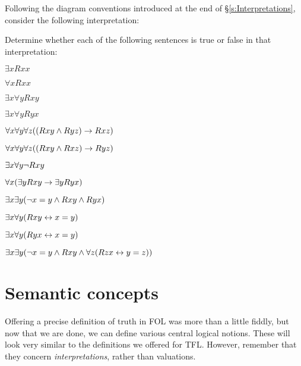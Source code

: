 \problempart
\label{pr.TorF3}
Following the diagram conventions introduced at the end of \S\ref{s:Interpretations}, consider the following interpretation:	
\begin{center}
\end{center}
Determine whether each of the following sentences is true or false in that interpretation:
\begin{earg}
\item $\exists x Rxx$
\item $\forall x Rxx$
\item $\exists x \forall y Rxy$
\item $\exists x \forall y Ryx$
\item $\forall x \forall y \forall z ((Rxy \wedge Ryz) \rightarrow Rxz)$
\item $\forall x \forall y \forall z ((Rxy \wedge Rxz) \rightarrow Ryz)$
\item $\exists x \forall y \neg Rxy$
\item $\forall x(\exists y Rxy \rightarrow \exists y Ryx)$
\item $\exists x \exists y (\neg x = y \wedge Rxy \wedge Ryx)$
\item $\exists x \forall y(Rxy \leftrightarrow x = y)$
\item $\exists x \forall y(Ryx \leftrightarrow x = y)$
\item $\exists x \exists y(\neg x = y \wedge Rxy \wedge \forall z(Rzx \leftrightarrow y = z))$
\end{earg}


\chapter{Semantic concepts}

Offering a precise definition of truth in FOL was more than a little fiddly, but now that we are done, we can define various central logical notions. These will look very similar to the definitions we offered for TFL. However, remember that they concern \emph{interpretations}, rather than valuations. 


